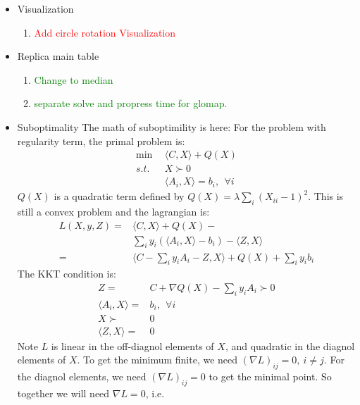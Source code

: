 \begin{itemize}
\begin{enumerate}[label={\checkmark}]
    \end{enumerate}
    \item Visualization
    \begin{enumerate}[label={\checkmark}]
        \item \textcolor{red}{Add circle rotation Visualization}
    \end{enumerate}
    \item Replica main table
    \begin{enumerate}[label={\checkmark}]
        \item \textcolor{green}{Change to median}
        \item \textcolor{green}{separate solve and propress time for glomap.}
    \end{enumerate}
    \item Suboptimality
    The math of suboptimility is here:
    For the problem with regularity term, the primal problem is:
    \begin{align}
    \min ~~&\langle C, X \rangle + Q(X)\\
    s.t. ~~&X \succ 0\\
    & \langle A_i, X \rangle = b_i, ~~\forall i
    \end{align}
    $Q(X)$ is a quadratic term defined by $Q(X) = \lambda \sum_i (X_{ii}-1)^2$. This is still a convex problem and the lagrangian is:
    \begin{align}
    L(X, y, Z) =& \langle C, X \rangle + Q(X) - \\&\sum_i y_i (\langle A_i, X \rangle - b_i) - \langle Z, X \rangle \\
    =& \langle C - \sum_i y_i A_i - Z, X \rangle + Q(X) + \sum_i y_i b_i
    \end{align}
    The KKT condition is:
    \begin{align}
    Z =& C + \nabla Q(X) - \sum_i y_i A_i \succ 0 \\
    \langle A_i, X \rangle =& b_i, ~~\forall i \\
    X \succ & 0 \\
    \langle Z, X \rangle = & 0
    \end{align}
    Note $L$ is linear in the off-diagnol elements of $X$, and quadratic in the diagnol elements of $X$. To get the minimum finite, we need $(\nabla L)_{ij} = 0,~i\neq j$. For the diagnol elements, we need $(\nabla L)_{ij} = 0$ to get the minimal point. So together we will need $\nabla L = 0$, i.e.

\end{itemize}
